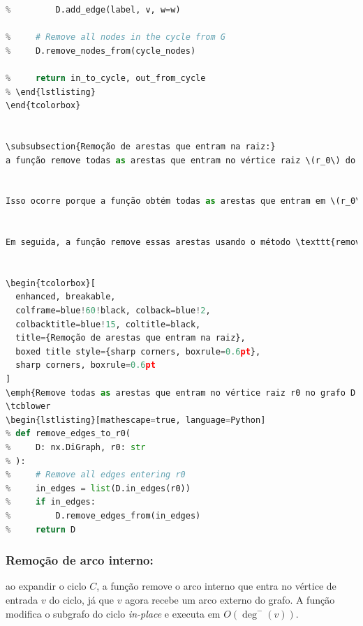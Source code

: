 \begin{tcolorbox}
\begin{lstlisting}[mathescape=true, language=Python]
%     for v, (u, w) in out_from_cycle.items():
%         D.add_edge(label, v, w=w)

%     # Remove all nodes in the cycle from G
%     D.remove_nodes_from(cycle_nodes)

%     return in_to_cycle, out_from_cycle  
% \end{lstlisting}
\end{tcolorbox}


\subsubsection{Remoção de arestas que entram na raiz:}
a função remove todas as arestas que entram no vértice raiz \(r_0\) do grafo \(G\). A função modifica o grafo \emph{in-place} e executa em \(O(\deg^-(r_0))\).


Isso ocorre porque a função obtém todas as arestas que entram em \(r_0\) usando o método \texttt{in\_edges} do NetworkX, que tem complexidade \(O(\deg^-(r_0))\).


Em seguida, a função remove essas arestas usando o método \texttt{remove\_edges\_from}, que também opera em tempo linear em relação ao número de arestas sendo removidas. Portanto, o tempo total de execução da função é \(O(\deg^-(r_0))\). A função não cria uma cópia do grafo original, mas altera diretamente a estrutura de dados do grafo fornecido.


\begin{tcolorbox}[
  enhanced, breakable,
  colframe=blue!60!black, colback=blue!2,
  colbacktitle=blue!15, coltitle=black,
  title={Remoção de arestas que entram na raiz},
  boxed title style={sharp corners, boxrule=0.6pt},
  sharp corners, boxrule=0.6pt
]
\emph{Remove todas as arestas que entram no vértice raiz r0 no grafo D. Por fim, retorna o grafo atualizado.}
\tcblower
\begin{lstlisting}[mathescape=true, language=Python]
% def remove_edges_to_r0(
%     D: nx.DiGraph, r0: str
% ):
%     # Remove all edges entering r0
%     in_edges = list(D.in_edges(r0))
%     if in_edges:
%         D.remove_edges_from(in_edges)
%     return D
\end{lstlisting}
\end{tcolorbox}


\subsubsection{Remoção de arco interno:}
ao expandir o ciclo \(C\), a função remove o arco interno que entra no vértice de entrada \(v\) do ciclo, já que \(v\) agora recebe um arco externo do grafo. A função modifica o subgrafo do ciclo \emph{in-place} e executa em \(O(\deg^-(v))\).

